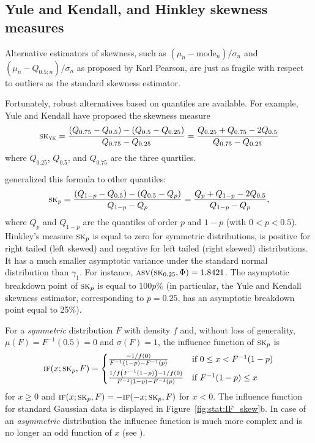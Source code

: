 \subsection{Yule and Kendall, and Hinkley skewness measures}

Alternative estimators of skewness, such as $(\mu_n-\text{mode}_n)/\sigma_n$ 
and $(\mu_n-Q_{0.5;n})/\sigma_n$ as proposed by Karl Pearson,
are just as fragile with respect to outliers as the standard
skewness estimator. 

Fortunately, robust alternatives based on quantiles are
available. For example, Yule and Kendall have proposed the skewness measure     
\[
    \stsc{SK}_{\stsc{YK}}
    = \frac{(Q_{0.75} - Q_{0.5}) - (Q_{0.5}-Q_{0.25})}{Q_{0.75} - Q_{0.25}}
    = \frac{Q_{0.25} + Q_{0.75} - 2Q_{0.5}}{Q_{0.75} - Q_{0.25}}
\]
where $Q_{0.25}$, $Q_{0.5}$, and $Q_{0.75}$ are the three quartiles.

\citet{hinkley:1975} generalized this formula to other quantiles:
\[
    \stsc{SK}_p 
    = \frac{(Q_{1-p} - Q_{0.5}) - (Q_{0.5} - Q_p)}{Q_{1-p} - Q_p}
    = \frac{Q_p + Q_{1-p} - 2Q_{0.5}}{Q_{1-p} - Q_p},
\]
where $Q_p$ and $Q_{1-p}$ are the quantiles of order $p$ and $1-p$ (with
$0<p<0.5$). Hinkley's measure $\stsc{SK}_p$ is equal to zero for symmetric
distributions, is positive for right tailed (left skewed) and negative for left
tailed (right skewed) distributions. It has a much smaller asymptotic variance
under the standard normal distribution than $\gamma_1$. For instance,
$\stsc{ASV}(\stsc{SK}_{0.25}, \Phi) = 1.8421$.                                  
The asymptotic breakdown point of $\stsc{SK}_p$ is equal to $100p\%$ (in
particular, the Yule and Kendall skewness estimator, corresponding to $p=0.25$,
has an asymptotic breakdown point equal to 25\%).

For a \emph{symmetric} distribution $F$ with density $f$ and, without loss of
generality, $\mu(F) = F^{-1}(0.5) = 0$ and $\sigma(F) = 1$, the influence
function of $\stsc{SK}_p$ is
\[
    \stsc{IF}(x; \stsc{SK}_p, F) =
    \begin{cases}
        \frac{-1 / f(0)}{F^{-1}(1-p) - F^{-1}(p)}                            & \text{if $0\leq x < F^{-1}(1-p)$} \\[1ex]
        \frac{1/f\left(F^{-1}(1-p)\right) - 1/f(0)}{F^{-1}(1-p) - F^{-1}(p)} & \text{if $F^{-1}(1-p)\leq x$}
    \end{cases}
\]
for $x \geq 0$ and $\stsc{IF}(x; \stsc{SK}_p, F) = -\stsc{IF}(-x;
\stsc{SK}_p, F)$ for $x<0$. The influence function for standard Gaussian data
is displayed in Figure~\ref{fig:stat:IF_skew}b. In case of an
\emph{asymmetric} distribution the influence function is much more complex
and is no longer an odd function of $x$ (see \citealp[p.~101]{groeneveld:1991}).

